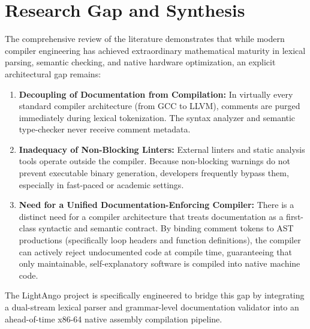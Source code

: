 \section{Research Gap and Synthesis}
The comprehensive review of the literature demonstrates that while modern compiler engineering has achieved extraordinary mathematical maturity in lexical parsing, semantic checking, and native hardware optimization, an explicit architectural gap remains:
\begin{enumerate}
    \item \textbf{Decoupling of Documentation from Compilation:} In virtually every standard compiler architecture (from GCC to LLVM), comments are purged immediately during lexical tokenization. The syntax analyzer and semantic type-checker never receive comment metadata.
    \item \textbf{Inadequacy of Non-Blocking Linters:} External linters and static analysis tools operate outside the compiler. Because non-blocking warnings do not prevent executable binary generation, developers frequently bypass them, especially in fast-paced or academic settings.
    \item \textbf{Need for a Unified Documentation-Enforcing Compiler:} There is a distinct need for a compiler architecture that treats documentation as a first-class syntactic and semantic contract. By binding comment tokens to AST productions (specifically loop headers and function definitions), the compiler can actively reject undocumented code at compile time, guaranteeing that only maintainable, self-explanatory software is compiled into native machine code.
\end{enumerate}

The LightAngo project is specifically engineered to bridge this gap by integrating a dual-stream lexical parser and grammar-level documentation validator into an ahead-of-time x86-64 native assembly compilation pipeline.
\newpage
